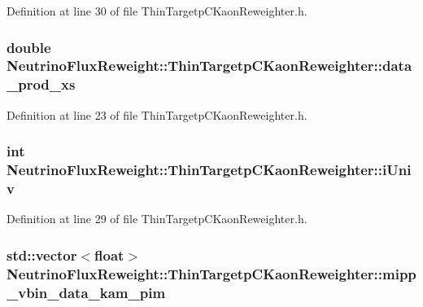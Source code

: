 Definition at line 30 of file Thin\-Targetp\-C\-Kaon\-Reweighter.\-h.

\hypertarget{class_neutrino_flux_reweight_1_1_thin_targetp_c_kaon_reweighter_ae26e9fbd1c42a53759a1587a3312a4fb}{
\subsubsection[{data\-\_\-prod\-\_\-xs}]{\setlength{\rightskip}{0pt plus 5cm}double Neutrino\-Flux\-Reweight\-::\-Thin\-Targetp\-C\-Kaon\-Reweighter\-::data\-\_\-prod\-\_\-xs}}\label{class_neutrino_flux_reweight_1_1_thin_targetp_c_kaon_reweighter_ae26e9fbd1c42a53759a1587a3312a4fb}


Definition at line 23 of file Thin\-Targetp\-C\-Kaon\-Reweighter.\-h.

\hypertarget{class_neutrino_flux_reweight_1_1_thin_targetp_c_kaon_reweighter_a3ff9d5c19007a8272c69e15cc3c7742b}{
\subsubsection[{i\-Univ}]{\setlength{\rightskip}{0pt plus 5cm}int Neutrino\-Flux\-Reweight\-::\-Thin\-Targetp\-C\-Kaon\-Reweighter\-::i\-Univ\hspace{0.3cm}{\ttfamily [private]}}}\label{class_neutrino_flux_reweight_1_1_thin_targetp_c_kaon_reweighter_a3ff9d5c19007a8272c69e15cc3c7742b}


Definition at line 29 of file Thin\-Targetp\-C\-Kaon\-Reweighter.\-h.

\hypertarget{class_neutrino_flux_reweight_1_1_thin_targetp_c_kaon_reweighter_ab268b6554b6abe96854cec82f336816d}{
\subsubsection[{mipp\-\_\-vbin\-\_\-data\-\_\-kam\-\_\-pim}]{\setlength{\rightskip}{0pt plus 5cm}std\-::vector$<$float$>$ Neutrino\-Flux\-Reweight\-::\-Thin\-Targetp\-C\-Kaon\-Reweighter\-::mipp\-\_\-vbin\-\_\-data\-\_\-kam\-\_\-pim}}\label{class_neutrino_flux_reweight_1_1_thin_targetp_c_kaon_reweighter_ab268b6554b6abe96854cec82f336816d}


